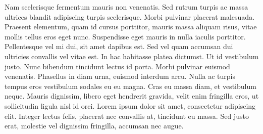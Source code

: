 Nam scelerisque fermentum mauris non venenatis.
Sed rutrum turpis ac massa ultrices blandit adipiscing turpis scelerisque.
Morbi pulvinar placerat malesuada.
Praesent elementum, quam id cursus porttitor, mauris massa aliquam risus, vitae mollis tellus eros eget nunc.
Suspendisse eget mauris in nulla iaculis porttitor.
Pellentesque vel mi dui, sit amet dapibus est.
Sed vel quam accumsan dui ultricies convallis vel vitae est.
In hac habitasse platea dictumst.
Ut id vestibulum justo.
Nunc bibendum tincidunt lectus id porta.
Morbi pulvinar euismod venenatis.
Phasellus in diam urna, euismod interdum arcu.
Nulla ac turpis tempus eros vestibulum sodales eu eu magna.
Cras eu massa diam, et vestibulum neque.
Mauris dignissim, libero eget hendrerit gravida, velit enim fringilla eros, ut sollicitudin ligula nisl id orci.
Lorem ipsum dolor sit amet, consectetur adipiscing elit.
Integer lectus felis, placerat nec convallis at, tincidunt eu massa.
Sed justo erat, molestie vel dignissim fringilla, accumsan nec augue.

